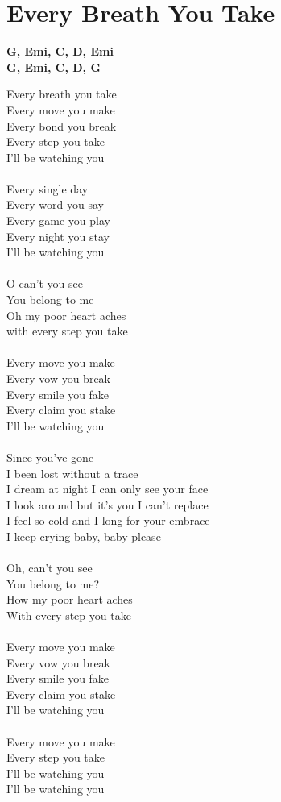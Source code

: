 \section{Every Breath You Take}
\footnotesize\textbf{G, Emi, C, D, Emi}\\
\textbf{G, Emi, C, D, G}\\
\normalsize
\begin{multicols}{2}
Every breath you take\\
Every move you make\\
Every bond you break\\
Every step you take\\
I'll be watching you\\
\\
Every single day\\
Every word you say\\
Every game you play\\
Every night you stay\\
I'll be watching you\\
\\
O can't you see\\
You belong to me\\
Oh my poor heart aches \\
with every step you take\\
\\
Every move you make\\
Every vow you break\\
Every smile you fake\\
Every claim you stake\\
I'll be watching you\\
\columnbreak\\
Since you've gone \\
I been lost without a trace\\
I dream at night I can only see your face\\
I look around but it's you I can't replace\\
I feel so cold and I long for your embrace\\
I keep crying baby, baby please\\
\\
Oh, can't you see\\
You belong to me?\\
How my poor heart aches \\
With every step you take\\
\\
Every move you make\\
Every vow you break\\
Every smile you fake \\
Every claim you stake\\
I'll be watching you\\
\\
Every move you make \\
Every step you take\\
I'll be watching you\\
I'll be watching you
\end{multicols}